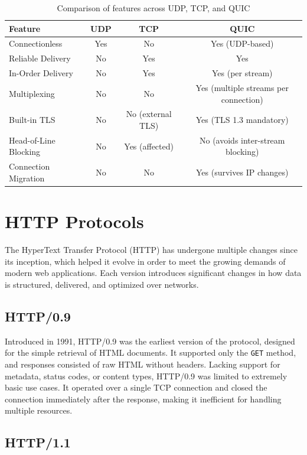 \begin{table}[H]
\centering
\begin{tabular}{|p{4cm}|c|c|c|}
\hline
\textbf{Feature} & \textbf{UDP} & \textbf{TCP} & \textbf{QUIC} \\
\hline
Connectionless & Yes & No & Yes (UDP-based) \\
\hline
Reliable Delivery & No & Yes & Yes \\
\hline
In-Order Delivery & No & Yes & Yes (per stream) \\
\hline
Multiplexing & No & No & Yes (multiple streams per connection) \\
\hline
Built-in TLS & No & No (external TLS) & Yes (TLS 1.3 mandatory) \\
\hline
Head-of-Line Blocking & No & Yes (affected) & No (avoids inter-stream blocking) \\
\hline
Connection Migration & No & No & Yes (survives IP changes) \\
\hline
\end{tabular}
\caption{Comparison of features across UDP, TCP, and QUIC}
\label{tab:tcp-udp-quic-comparison}
\end{table}



\section{HTTP Protocols}

The HyperText Transfer Protocol (HTTP) has undergone multiple changes since its inception, which helped it evolve in order to meet the growing demands of modern web applications. Each version introduces significant changes in how data is structured, delivered, and optimized over networks.

\subsection{HTTP/0.9}

Introduced in 1991, HTTP/0.9 was the earliest version of the protocol, designed for the simple retrieval of HTML documents. It supported only the \texttt{GET} method, and responses consisted of raw HTML without headers. Lacking support for metadata, status codes, or content types, HTTP/0.9 was limited to extremely basic use cases. It operated over a single TCP connection and closed the connection immediately after the response, making it inefficient for handling multiple resources.

\subsection{HTTP/1.1}

